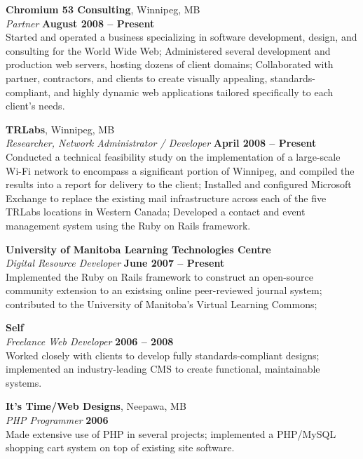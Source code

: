 \documentclass[margin,line,letterpaper]{resume}
\begin{document}
\begin{resume}
  {\bf Chromium 53 Consulting}, Winnipeg, MB \vspace{2mm}\\\vspace{1mm}%
  {\sl Partner} \hfill {\bf August 2008 -- Present}\\
  Started and operated a business specializing in software development, design, and
  consulting for the World Wide Web; Administered several development and production web servers,
  hosting dozens of client domains; Collaborated with partner, contractors, and clients to create
  visually appealing, standards-compliant, and highly dynamic web applications tailored specifically
  to each client's needs.

  {\bf TRLabs}, Winnipeg, MB \vspace{2mm}\\\vspace{1mm}%
  {\sl Researcher, Network Administrator / Developer} \hfill {\bf April 2008 -- Present}\\
  Conducted a technical feasibility study on the implementation of a large-scale Wi-Fi
  network to encompass a significant portion of Winnipeg, and compiled the results into a report
  for delivery to the client; Installed and configured Microsoft Exchange to replace the
  existing mail infrastructure across each of the five TRLabs locations in Western Canada;
  Developed a contact and event management system using the Ruby on Rails framework.

  {\bf University of Manitoba Learning Technologies Centre} \vspace{2mm}\\\vspace{1mm}%
  {\sl Digital Resource Developer} \hfill {\bf June 2007 -- Present}\\
  Implemented the Ruby on Rails framework to construct an open-source
  community extension to an existsing online peer-reviewed journal system; contributed to the
  University of Manitoba's Virtual Learning Commons;

  {\bf Self} \vspace{2mm}\\\vspace{1mm}%
  {\sl Freelance Web Developer} \hfill {\bf 2006 -- 2008}\\
  Worked closely with clients to develop fully standards-compliant designs; implemented
  an industry-leading CMS to create functional, maintainable systems.

  {\bf It's Time/Web Designs}, Neepawa, MB \vspace{2mm}\\\vspace{1mm}%
  {\sl PHP Programmer} \hfill {\bf 2006}\\
  Made extensive use of PHP in several projects; implemented a PHP/MySQL shopping cart
  system on top of existing site software.


\end{resume}
\end{document}
